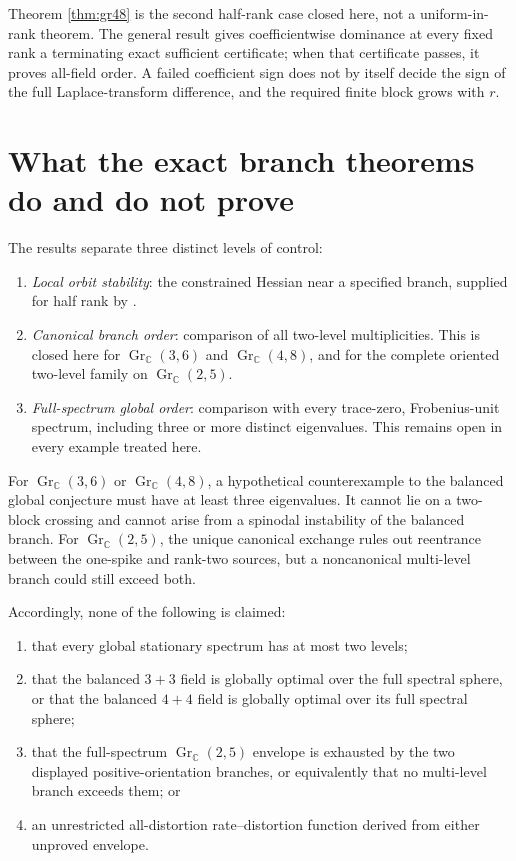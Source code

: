 \documentclass[11pt]{article}
\newcommand{\C}{\mathbb C}
\newcommand{\Gr}{\operatorname{Gr}}
\begin{document}
Theorem \ref{thm:gr48} is the second half-rank case closed here, not a
uniform-in-rank theorem.  The general result gives coefficientwise dominance
at every fixed rank a terminating exact sufficient certificate; when that
certificate passes, it proves all-field order.  A failed coefficient sign
does not by itself decide the sign of the full Laplace-transform difference,
and the required finite block grows with $r$.

\section{What the exact branch theorems do and do not prove}

The results separate three distinct levels of control:
\begin{enumerate}[label=(\alph*)]
\item \emph{Local orbit stability}: the constrained Hessian near a specified
      branch, supplied for half rank by \cite{ErikssonMorseBott2026}.
\item \emph{Canonical branch order}: comparison of all two-level
      multiplicities.  This is closed here for $\Gr_{\C}(3,6)$ and
      $\Gr_{\C}(4,8)$, and for the complete oriented two-level family on
      $\Gr_{\C}(2,5)$.
\item \emph{Full-spectrum global order}: comparison with every trace-zero,
      Frobenius-unit spectrum, including three or more distinct eigenvalues.
      This remains open in every example treated here.
\end{enumerate}

For $\Gr_{\C}(3,6)$ or $\Gr_{\C}(4,8)$, a hypothetical counterexample to the balanced global
conjecture must have at least three eigenvalues.  It cannot lie on a
two-block crossing and cannot arise from a spinodal instability of the
balanced branch.  For $\Gr_{\C}(2,5)$, the unique canonical exchange rules
out reentrance between the one-spike and rank-two sources, but a noncanonical
multi-level branch could still exceed both.

Accordingly, none of the following is claimed:
\begin{enumerate}[label=(\roman*)]
\item that every global stationary spectrum has at most two levels;
\item that the balanced $3+3$ field is globally optimal over the full
      spectral sphere, or that the balanced $4+4$ field is globally optimal
      over its full spectral sphere;
\item that the full-spectrum $\Gr_{\C}(2,5)$ envelope is exhausted by the
      two displayed positive-orientation branches, or equivalently that no
      multi-level branch exceeds them; or
\item an unrestricted all-distortion rate--distortion function derived from
      either unproved envelope.
\end{enumerate}
\end{document}
